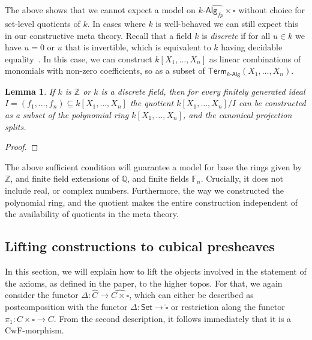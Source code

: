\documentclass[10pt,a4paper]{article}
\newtheorem{lemma}{Lemma}[section]
\newcommand{\ints}{\mathbb{Z}}
\newcommand{\rats}{\mathbb{Q}}
\newcommand{\Set}{\mathsf{Set}}
\newcommand{\Alg}{\mathsf{Alg}}
\newcommand\Term{\mathsf{Term}}
\begin{document}
The above shows that we cannot expect a model on $\widehat{k\text{-}\Alg_{fp} \times \square}$ without choice for set-level quotients of $k$.
In cases where $k$ is well-behaved we can still expect this in our constructive meta theory.
Recall that a field $k$ is \emph{discrete} if for all $u \in k$ we have $u = 0$ or $u$ that is invertible, which is equivalent to $k$ having decidable equality~\cite{mines}.
In this case, we can construct $k[X_1, \ldots, X_n]$ as linear combinations of monomials with non-zero coefficients, so as a subset of $\Term_{k\text{-}\Alg}(X_1, \ldots, X_n)$.

\begin{lemma}
  If $k$ is $\ints$ or $k$ is a discrete field, then for every finitely generated ideal $I = (f_1, \ldots, f_n) \subseteq k[X_1, \ldots, X_n]$ the quotient $k[X_1,\ldots,X_n]/I$ can be constructed as a subset of the polynomial ring $k[X_1, \ldots, X_n]$, and the canonical projection splits.
\end{lemma}
\begin{proof}
\end{proof}

The above sufficient condition will guarantee a model for base the rings given by $\ints$, and finite field extensions of $\rats$, and finite fields $\mathbb F_n$.
Crucially, it does not include real, or complex numbers.
Furthermore, the way we constructed the polynomial ring, and the quotient makes the entire construction independent of the availability of quotients in the meta theory.


\subsection{Lifting constructions to cubical presheaves}\label{sec:lifting-objects}

In this section, we will explain how to lift the objects involved in the statement of the axioms, as defined in the paper, to the higher topos.
For that, we again consider the functor $\Delta \colon \widehat{C} \to \widehat{C \times \square}$, which can either be described as postcomposition with the functor $\Delta \colon \Set \to \widehat\square$ or restriction along the functor $\pi_1 \colon C \times \square \to C$.
From the second description, it follows immediately that it is a CwF-morphism.
\end{document}
